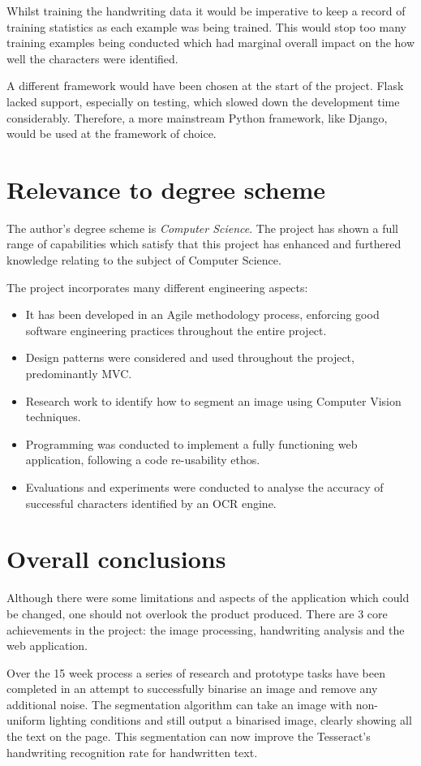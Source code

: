 Whilst training the handwriting data it would be imperative to keep a record of  training statistics as each example was being trained. This would stop too many training examples being conducted which had marginal overall impact on the how well the characters were identified.

A different framework would have been chosen at the start of the project. Flask lacked support, especially on testing, which slowed down the development time considerably. Therefore, a more mainstream Python framework, like Django, would be used at the framework of choice.

\section{Relevance to degree scheme}
The author's degree scheme is \textit{Computer Science}. The project has shown a full range of capabilities which satisfy that this project has enhanced and furthered knowledge relating to the subject of Computer Science.

The project incorporates many different engineering aspects:
\begin{itemize}
	\item It has been developed in an Agile methodology process, enforcing good software engineering practices throughout the entire project.
	\item Design patterns were considered and used throughout the project, predominantly MVC.
	\item Research work to identify how to segment an image using Computer Vision techniques.
	\item Programming was conducted to implement a fully functioning web application, following a code re-usability ethos.
	\item Evaluations and experiments were conducted to analyse the accuracy of successful characters identified by an OCR engine.
\end{itemize}

\section{Overall conclusions}
Although there were some limitations and aspects of the application which could be changed, one should not overlook the product produced. There are 3 core achievements in the project: the image processing, handwriting analysis and the web application.

Over the 15 week process a series of research and prototype tasks have been completed in an attempt to successfully binarise an image and remove any additional noise. The segmentation algorithm can take an image with non-uniform lighting conditions and still output a binarised image, clearly showing all the text on the page. This segmentation can now improve the Tesseract's handwriting recognition rate for handwritten text.

